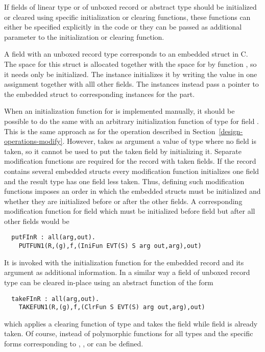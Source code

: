 If fields of linear type or of unboxed record or abstract type should be initialized or cleared using specific initialization
or clearing functions, these functions can either be specified explicitly in the code or they can be passed as additional
parameter to the initialization or clearing function. 

A field  with an unboxed record type  corresponds to an embedded struct in C. The space for this struct is allocated together
with the space for  by function , so it needs only be initialized. The  instance initializes 
it by writing the value in one assignment together with alll other fields. The  instances instead pass a pointer 
to the embedded struct to corresponding  instances for the part. 

When an initialization function for  is implemented
manually, it should be possible to do the same with an arbitrary initialization function of type 
for field . This is the same approach as for the operation  described in Section~\ref{design-operations-modify}.
However,  takes as argument a value of type 
where no field is taken, so it cannot be used to put the taken field  by initializing it. Separate modification functions
are required for the record with taken fields. If the record contains several embedded structs every modification function
initializes one field and the result type has one field less taken. Thus, defining such modification functions imposes an order
in which the embedded structs must be initialized and whether they are initialized before or after the other fields. A corresponding
modification function for field  which must be initialized before field  but after all other fields would be
\begin{verbatim}
  putFInR : all(arg,out). 
    PUTFUN1(R,(g),f,(IniFun EVT(S) S arg out,arg),out)
\end{verbatim}
It is invoked with the initialization function for the embedded record and its argument 
as additional information. In a similar way a field of unboxed record type  can be cleared in-place using an abstract
function of the form
\begin{verbatim}
  takeFInR : all(arg,out).
    TAKEFUN1(R,(g),f,(ClrFun S EVT(S) arg out,arg),out)
\end{verbatim}
which applies a clearing function of type  and takes the field  while field  
is already taken. Of course, instead of polymorphic functions for all types  and  the specific forms
corresponding to , , or  can be defined.

